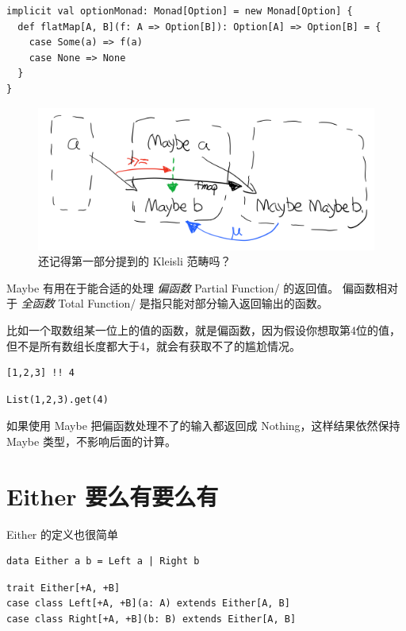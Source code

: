 \documentclass[11pt]{tufte-book}
\begin{document}
\begin{verbatim}
implicit val optionMonad: Monad[Option] = new Monad[Option] {
  def flatMap[A, B](f: A => Option[B]): Option[A] => Option[B] = {
    case Some(a) => f(a)
    case None => None
  }
}
\end{verbatim}

\begin{figure}[htbp]
\centering
\includegraphics[width=.9\linewidth]{images/p2-maybe-kleisli.png}
\caption{还记得第一部分提到的 Kleisli 范畴吗？}
\end{figure}

Maybe 有用在于能合适的处理 \emph{偏函数} Partial Function/ 的返回值。
偏函数相对于 \emph{全函数} Total Function/ 是指只能对部分输入返回输出的函数。

比如一个取数组某一位上的值的函数，就是偏函数，因为假设你想取第4位的值，但不是所有数组长度都大于4，就会有获取不了的尴尬情况。
\begin{verbatim}
[1,2,3] !! 4
\end{verbatim}

\begin{verbatim}
List(1,2,3).get(4)
\end{verbatim}

如果使用 Maybe 把偏函数处理不了的输入都返回成 Nothing，这样结果依然保持 Maybe 类型，不影响后面的计算。

\chapter{Either 要么有要么有}
\label{sec:orgdb30dec}

Either 的定义也很简单
\begin{verbatim}
data Either a b = Left a | Right b
\end{verbatim}

\begin{verbatim}
trait Either[+A, +B]
case class Left[+A, +B](a: A) extends Either[A, B]
case class Right[+A, +B](b: B) extends Either[A, B]
\end{verbatim}
\end{document}
